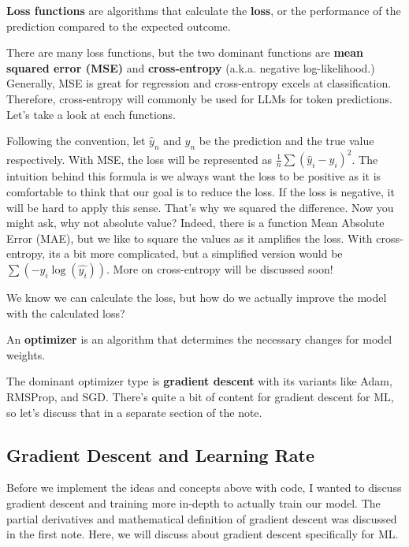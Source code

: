 \documentclass[../../../main.tex]{subfiles}
\begin{document}
\begin{definition}{}{}
\textbf{Loss functions} are algorithms that calculate the
\textbf{loss}, or the performance of the prediction compared to
the expected outcome.
\end{definition}

There are many loss functions, but the two dominant functions are
\textbf{mean squared error (MSE)} and \textbf{cross-entropy} (a.k.a.
negative log-likelihood.) Generally, MSE is great for regression
and cross-entropy excels at classification. Therefore, cross-entropy
will commonly be used for LLMs for token predictions. Let's take a
look at each functions.

Following the convention, let $\hat{y}_n$ and $y_n$ be the prediction
and the true value respectively. With MSE, the loss will be
represented as $\frac{1}{n} \sum (\hat{y}_i - y_i)^2$. The intuition
behind this formula is we always want the loss to be positive as
it is comfortable to think that our goal is to reduce the loss.
If the loss is negative, it will be hard to apply this sense.
That's why we squared the difference. Now you might ask, why not
absolute value? Indeed, there is a function Mean Absolute Error (MAE),
but we like to square the values as it amplifies the loss.
With cross-entropy, its a bit more complicated, but a simplified
version would be $\sum (-y_i \log(\hat{y_i}))$. More on cross-entropy
will be discussed soon!

We know we can calculate the loss, but how do we actually improve
the model with the calculated loss?

\begin{definition}{}{}
An \textbf{optimizer} is an algorithm that determines the necessary
changes for model weights.
\end{definition}

The dominant optimizer type is \textbf{gradient descent} with its
variants like Adam, RMSProp, and SGD. There's quite a bit of content
for gradient descent for ML, so let's discuss that in a separate
section of the note.

\subsection{Gradient Descent and Learning Rate}

Before we implement the ideas and concepts above with code, I wanted
to discuss gradient descent and training more in-depth to actually
train our model. The partial derivatives and mathematical definition
of gradient descent was discussed in the first note. Here, we will
discuss about gradient descent specifically for ML.
\end{document}
